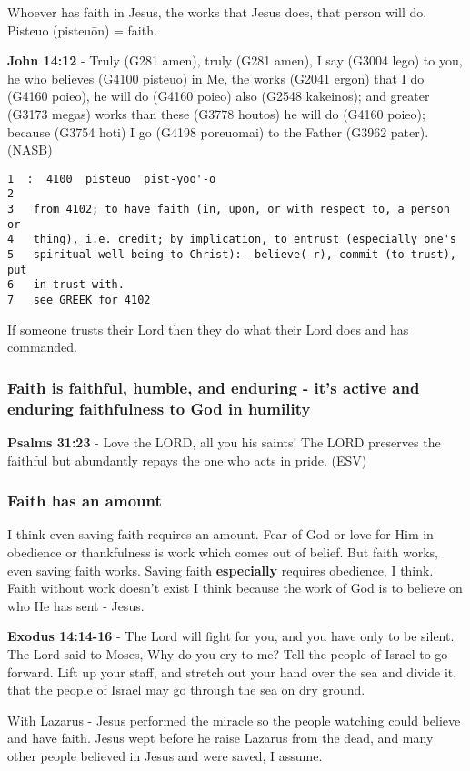 \documentclass[11pt]{article}
\begin{document}
Whoever has faith in Jesus, the works that Jesus does, that person will do.
Pisteuo (pisteuōn) = faith.

\textbf{John 14:12} - Truly (G281 amen), truly (G281 amen), I say (G3004 lego) to you, he who believes (G4100 pisteuo) in Me, the works (G2041 ergon) that I do (G4160 poieo), he will do (G4160 poieo) also (G2548 kakeinos); and greater (G3173 megas) works than these (G3778 houtos) he will do (G4160 poieo); because (G3754 hoti) I go (G4198 poreuomai) to the Father (G3962 pater). (NASB)

\begin{verbatim}
1  :  4100  pisteuo  pist-yoo'-o
2  
3   from 4102; to have faith (in, upon, or with respect to, a person or
4   thing), i.e. credit; by implication, to entrust (especially one's
5   spiritual well-being to Christ):--believe(-r), commit (to trust), put
6   in trust with.
7   see GREEK for 4102
\end{verbatim}

If someone trusts their Lord then they do what their Lord does and has commanded.

\subsubsection{Faith is faithful, humble, and enduring - it's active and enduring faithfulness to God in humility}
\label{sec:org202dd0f}
\textbf{Psalms 31:23} - Love the LORD, all you his saints! The LORD preserves the faithful but abundantly repays the one who acts in pride. (ESV)

\subsubsection{Faith has an amount}
\label{sec:org4f5e1e7}
I think even saving faith requires an amount.
Fear of God or love for Him in obedience or thankfulness is work which comes out of belief.
But faith works, even saving faith works. Saving faith \textbf{especially} requires obedience, I think.
Faith without work doesn't exist I think because the work of God is to believe on who He has sent - Jesus.

\textbf{Exodus 14:14-16} - The Lord will fight for you, and you have only to be silent.  The Lord said to Moses, Why do you cry to me? Tell the people of Israel to go forward.  Lift up your staff, and stretch out your hand over the sea and divide it, that the people of Israel may go through the sea on dry ground.

With Lazarus - Jesus performed the miracle so the people watching could believe and have faith.
Jesus wept before he raise Lazarus from the dead, and many other people believed in Jesus and were saved, I assume.
\end{document}
